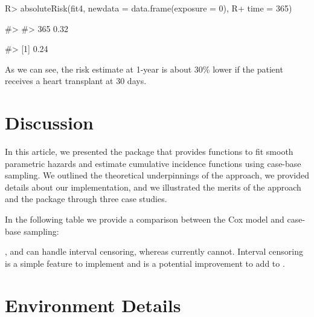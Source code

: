 \documentclass[
]{jss}
\begin{document}
\begin{CodeChunk}

\begin{CodeInput}
R> absoluteRisk(fit4, newdata = data.frame(exposure = 0),
R+              time = 365)
\end{CodeInput}

\begin{CodeOutput}
#>         
#> 365 0.32
\end{CodeOutput}


\begin{CodeOutput}
#> [1] 0.24
\end{CodeOutput}
\end{CodeChunk}

As we can see, the risk estimate at 1-year is about 30\% lower if the
patient receives a heart transplant at 30 days.

\hypertarget{discussion}{%
\section{Discussion}\label{discussion}}

In this article, we presented the  package 
that provides functions to fit smooth parametric hazards and estimate
cumulative incidence functions using case-base sampling. We outlined the
theoretical underpinnings of the approach, we provided details about our
implementation, and we illustrated the merits of the approach and the
package through three case studies.

In the following table we provide a comparison between the Cox model and
case-base sampling:

,  and  can handle interval
censoring, whereas  currently cannot. Interval censoring
is a simple feature to implement and is a potential improvement to add
to .

\hypertarget{environment-details}{%
\section{Environment Details}\label{environment-details}}
\end{document}
